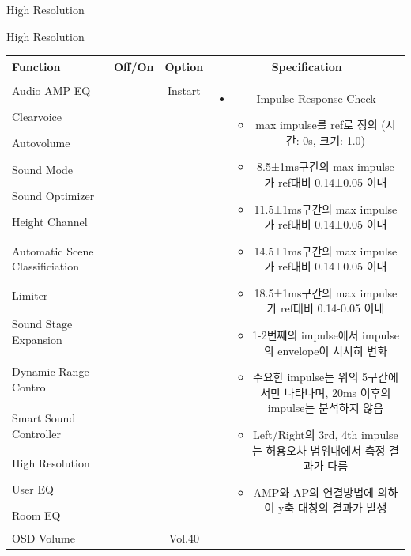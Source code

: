 \documentclass{beamer}
\begin{document}
\begin{frame}[t]{High Resolution}
\end{frame}

\begin{frame}[t]{High Resolution}
\begin{tiny}
\begin{tabular}{@{}lccc@{}}
\toprule
Function & Off/On & Option & Specification \\
\midrule
Audio AMP EQ & \color{black}{Off} & Instart &
\multirow{14}{60mm}{
\begin{itemize}
\item Impulse Response Check
  \begin{itemize}
  \item max impulse를 ref로 정의 (시간: 0s, 크기: 1.0)
  \item 8.5±1ms구간의 max impulse가 ref대비 0.14±0.05 이내
  \item 11.5±1ms구간의 max impulse가 ref대비 0.14±0.05 이내
  \item 14.5±1ms구간의 max impulse가 ref대비 0.14±0.05 이내
  \item 18.5±1ms구간의 max impulse가 ref대비 0.14-0.05 이내
  \item 1-2번째의 impulse에서 impulse의 envelope이 서서히 변화
  \item 주요한 impulse는 위의 5구간에서만 나타나며, 20ms 이후의 impulse는 분석하지 않음
  \item Left/Right의 3rd, 4th impulse는 허용오차 범위내에서 측정 결과가 다름
  \item AMP와 AP의 연결방법에 의하여 y축 대칭의 결과가 발생
  \end{itemize}
\end{itemize}
} \\
Clearvoice & \color{black}{Off} & & \\
Autovolume & \color{black}{Off} & & \\
Sound Mode & \color{black}{Off} & & \\
Sound Optimizer & \color{black}{Off} & & \\
Height Channel & \color{black}{Off} & & \\
Automatic Scene Classificiation & \color{black}{Off} & & \\
Limiter & \color{black}{Off} & & \\
Sound Stage Expansion & \color{black}{Off} & & \\
Dynamic Range Control & \color{black}{Off} & & \\
Smart Sound Controller & \color{black}{Off} & & \\
High Resolution & \color{blue}{On} & & \\
User EQ & \color{black}{Off} & & \\
Room EQ & \color{black}{Off} & & \\
OSD Volume & \color{blue}{On} & Vol.40 & \\
\midrule
\end{tabular}
\end{tiny}


\end{frame}
\end{document}
